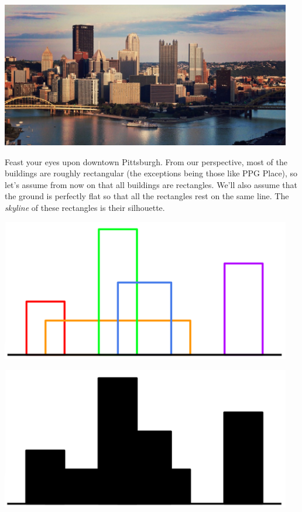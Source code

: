 \begin{gram}
\begin{center}
  \includegraphics[width=5in]{./skyline/media/pittsburgh.png}
\end{center}

Feast your eyes upon downtown Pittsburgh. From our perspective, most
of the buildings are roughly rectangular (the exceptions being those like PPG
Place), so let's assume from now on that all buildings are rectangles. We'll
also assume that the ground is perfectly flat so that all the rectangles rest
on the same line. The \emph{skyline} of these rectangles is their
silhouette.


\begin{center}
  \includegraphics[width=5in]{./skyline/media/buildings.png}

  \includegraphics[width=5in]{./skyline/media/silhouette.png}

\end{center}
\end{gram}

